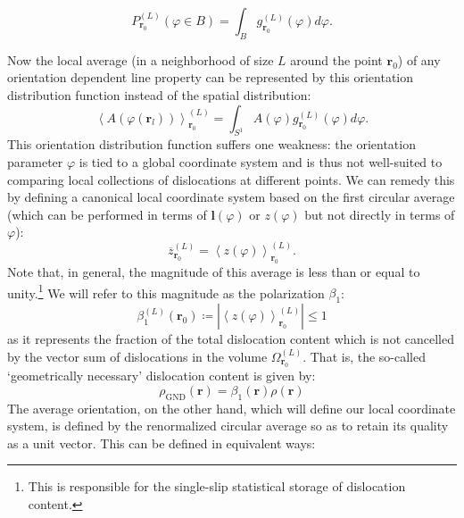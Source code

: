 \begin{equation}
P_{\boldsymbol{r}_{0}}^{(L)}(\varphi \in B) = \int_{B}^{}{g_{\boldsymbol{r}_{0}}^{(L)}(\varphi)d\varphi}.\label{eq:2odfDef}
\end{equation}

Now the local average (in a neighborhood of size \(L\) around the point \(\boldsymbol{r}_{0}\)) of any orientation dependent line property can be represented by this orientation distribution function instead of the spatial distribution:
\begin{equation}\left\langle A\left( \varphi\left( \boldsymbol{r}_{l} \right) \right) \right\rangle_{\boldsymbol{r}_{0}}^{(L)} = \int_{S^{1}}^{}{A(\varphi)g_{\boldsymbol{r}_{0}}^{(L)}(\varphi)d\varphi}.\end{equation}
This orientation distribution function suffers one weakness: the orientation parameter \(\varphi\) is tied to a global coordinate system and is thus not well-suited to comparing local collections of dislocations at different points. We can remedy this by defining a canonical local coordinate system based on the first circular average (which can be performed in terms of \(\boldsymbol{l}(\varphi)\) or \(z(\varphi)\) but not directly in terms of \(\varphi\)):
\begin{equation}
{\overline{z}}_{\boldsymbol{r}_{0}}^{(L)} = \left\langle z(\varphi) \right\rangle_{\boldsymbol{r}_{0}}^{(L)}.\label{eq:3zav}
\end{equation}
Note that, in general, the magnitude of this average is less than or equal to unity.\footnote{This is responsible for the single-slip statistical storage of dislocation content.} We will refer to this magnitude as the polarization
\(\beta_{1}\):
\begin{equation}\beta_{1}^{(L)}\left( \boldsymbol{r}_{0} \right) \coloneqq \left| \left\langle z(\varphi) \right\rangle_{\boldsymbol{r}_{0}}^{(L)} \right| \leq 1\end{equation}
as it represents the fraction of the total dislocation content which is
not cancelled by the vector sum of dislocations in the volume   $\Omega_{\boldsymbol{r}_{0}}^{(L)}$. That is, the so-called `geometrically necessary' dislocation content is given by:
\begin{equation}\rho_\text{GND}\left( \boldsymbol{r} \right)=\beta_{1}\left( \boldsymbol{r} \right)\rho\left( \boldsymbol{r} \right)\end{equation}
The average orientation, on the other hand, which will define our local coordinate system, is defined by the renormalized circular average so as to retain its quality as a unit vector. This can be defined in equivalent ways:
